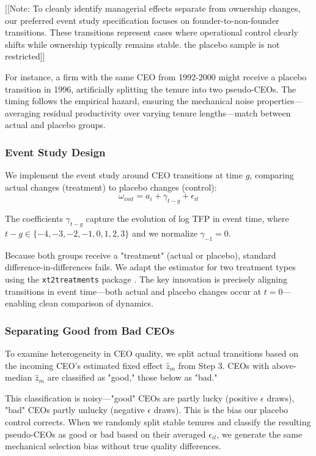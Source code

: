 \documentclass[11pt,a4paper]{article}
\begin{document}
[[Note: To cleanly identify managerial effects separate from ownership changes, our preferred event study specification focuses on founder-to-non-founder transitions. These transitions represent cases where operational control clearly shifts while ownership typically remains stable. the placebo sample is not restricted]]

For instance, a firm with the same CEO from 1992-2000 might receive a placebo transition in 1996, artificially splitting the tenure into two pseudo-CEOs. The timing follows the empirical hazard, ensuring the mechanical noise properties—averaging residual productivity over varying tenure lengths—match between actual and placebo groups.

\subsubsection{Event Study Design}

We implement the event study around CEO transitions at time $g$, comparing actual changes (treatment) to placebo changes (control):
\begin{equation}
\omega_{imt} = a_i + \gamma_{t-g} + \epsilon_{it}
\end{equation}

The coefficients $\gamma_{t-g}$ capture the evolution of log TFP in event time, where $t-g \in \{-4, -3, -2, -1, 0, 1, 2, 3\}$ and we normalize $\gamma_{-1} = 0$.

Because both groups receive a "treatment" (actual or placebo), standard difference-in-differences fails. We adapt the \citet{Callaway2021JoLE} estimator for two treatment types using the \texttt{xt2treatments} package \citep{Koren2024xt2treatments}. The key innovation is precisely aligning transitions in event time—both actual and placebo changes occur at $t=0$—enabling clean comparison of dynamics.

\subsubsection{Separating Good from Bad CEOs}

To examine heterogeneity in CEO quality, we split actual transitions based on the incoming CEO's estimated fixed effect $\hat{z}_m$ from Step 3. CEOs with above-median $\hat{z}_m$ are classified as "good," those below as "bad."

This classification is noisy—"good" CEOs are partly lucky (positive $\epsilon$ draws), "bad" CEOs partly unlucky (negative $\epsilon$ draws). This is the bias our placebo control corrects. When we randomly split stable tenures and classify the resulting pseudo-CEOs as good or bad based on their averaged $\epsilon_{it}$, we generate the same mechanical selection bias without true quality differences.
\end{document}
